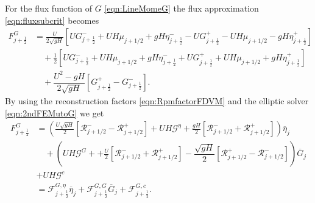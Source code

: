 For the flux function of $G$ \eqref{eqn:LineMomeG} the flux approximation \eqref{eqn:fluxsubcrit} becomes
\begin{align}
F^G_{j+\frac{1}{2}} &= \frac{U}{2 \sqrt{gH}} \left[ UG^-_{j+\frac{1}{2}} + UH \mu_{j+1/2} + gH\eta^-_{j+\frac{1}{2}} - UG^+_{j+\frac{1}{2}} - UH \mu_{j+1/2} - gH\eta^+_{j+\frac{1}{2}}  \right]   \nonumber \\ & \quad + \frac{1}{2}\left[UG^-_{j+\frac{1}{2}} + UH \mu_{j+1/2} + gH\eta^-_{j+\frac{1}{2}} + UG^+_{j+\frac{1}{2}} + UH \mu_{j+1/2} + gH\eta^+_{j+\frac{1}{2}}\right] \nonumber \\ & \quad+ \dfrac{U^2 - gH}{2\sqrt{g H}} \left [ G^+_{j+\frac{1}{2}} - G^-_{j+\frac{1}{2}} \right ].
\end{align}
By using the reconstruction factors \eqref{eqn:RpmfactorFDVM} and the elliptic solver \eqref{eqn:2ndFEMutoG} we get
\begin{align}
F^G_{j+\frac{1}{2}} &= \left(\frac{U\sqrt{gH}}{2} \left[ \mathcal{R}^-_{j+1/2} - \mathcal{R}^+_{j+1/2}  \right] + UH\mathcal{G}^{\eta} + \frac{gH}{2} \left[ \mathcal{R}^-_{j+1/2} +\mathcal{R}^+_{j+1/2} \right]   \right)\overline{\eta}_j \nonumber \\ & \quad+ \left(UH\mathcal{G}^{G} + + \frac{U}{2} \left[ \mathcal{R}^-_{j+1/2} +\mathcal{R}^+_{j+1/2} \right] - \dfrac{\sqrt{g H}}{2} \left [\mathcal{R}^+_{j+1/2} - \mathcal{R}^-_{j+1/2} \right ]   \right) \overline{G}_j \nonumber \\ &+ UH\mathcal{G}^{c}  \nonumber \\
& = \mathcal{F}^{G, \eta}_{j+\frac{1}{2}} \overline{\eta}_{j} + \mathcal{F}^{G, G}_{j+\frac{1}{2}} \overline{G}_{j} + \mathcal{F}^{G, c}_{j+\frac{1}{2}}   .
\label{eqn:FluxfactorsubcritG}
\end{align}




